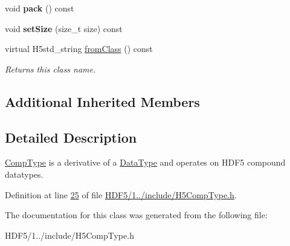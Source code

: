 \begin{DoxyCompactItemize}
\item 
\mbox{\label{class_h5_1_1_comp_type_adf67d04d2ee4ce4ff4d3e928dc22c11e}} 
void {\bfseries pack} () const
\item 
\mbox{\label{class_h5_1_1_comp_type_a4a125fd16425a78eb5990214749fa387}} 
void {\bfseries set\+Size} (size\+\_\+t size) const
\item 
\mbox{\label{class_h5_1_1_comp_type_a2413f08e41c809f5cc1a9f3ea9fe32fd}} 
virtual H5std\+\_\+string \hyperlink{class_h5_1_1_comp_type_a2413f08e41c809f5cc1a9f3ea9fe32fd}{from\+Class} () const
\begin{DoxyCompactList}\small\item\em Returns this class name. \end{DoxyCompactList}\end{DoxyCompactItemize}
\subsection*{Additional Inherited Members}


\subsection{Detailed Description}
\hyperlink{class_h5_1_1_comp_type}{Comp\+Type} is a derivative of a \hyperlink{class_h5_1_1_data_type}{Data\+Type} and operates on H\+D\+F5 compound datatypes. 

Definition at line \hyperlink{_h_d_f5_21_810_81_2include_2_h5_comp_type_8h_source_l00025}{25} of file \hyperlink{_h_d_f5_21_810_81_2include_2_h5_comp_type_8h_source}{H\+D\+F5/1../include/\+H5\+Comp\+Type.\+h}.



The documentation for this class was generated from the following file\+:\begin{DoxyCompactItemize}
\item 
H\+D\+F5/1../include/\+H5\+Comp\+Type.\+h\end{DoxyCompactItemize}
